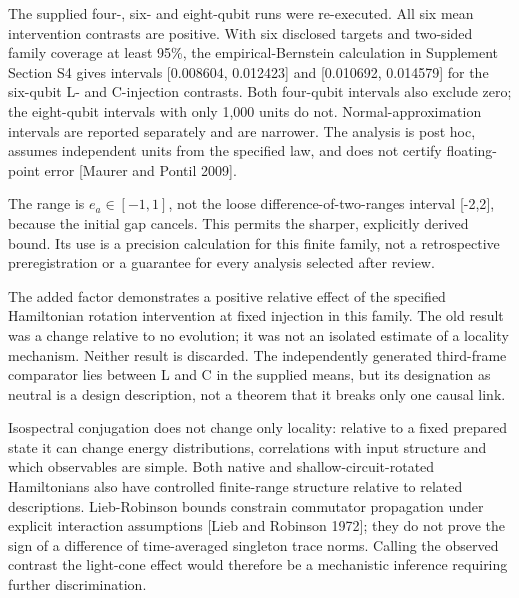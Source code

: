 \documentclass[
  10pt,
  a4paper,
]{article}
\makeatletter
\renewcommand\subsection{\@startsection{subsection}{2}{\z@}{-2ex \@plus -.8ex \@minus -.2ex}{.9ex \@plus .2ex}{\normalfont\large\bfseries}}
\makeatother
\begin{document}
The supplied four-, six- and eight-qubit runs were re-executed. All six
mean intervention contrasts are positive. With six disclosed targets and
two-sided family coverage at least 95\%, the empirical-Bernstein
calculation in Supplement Section S4 gives intervals {[}0.008604,
0.012423{]} and {[}0.010692, 0.014579{]} for the six-qubit L- and
C-injection contrasts. Both four-qubit intervals also exclude zero; the
eight-qubit intervals with only 1,000 units do not. Normal-approximation
intervals are reported separately and are narrower. The analysis is post
hoc, assumes independent units from the specified law, and does not
certify floating-point error {[}Maurer and Pontil 2009{]}.

The range is \(e_a\in[-1,1]\), not the loose difference-of-two-ranges
interval {[}-2,2{]}, because the initial gap cancels. This permits the
sharper, explicitly derived bound. Its use is a precision calculation
for this finite family, not a retrospective preregistration or a
guarantee for every analysis selected after review.

\subsection{6.4 Interpretation and
limits}\label{interpretation-and-limits}

The added factor demonstrates a positive relative effect of the
specified Hamiltonian rotation intervention at fixed injection in this
family. The old result was a change relative to no evolution; it was not
an isolated estimate of a locality mechanism. Neither result is
discarded. The independently generated third-frame comparator lies
between L and C in the supplied means, but its designation as neutral is
a design description, not a theorem that it breaks only one causal link.

Isospectral conjugation does not change only locality: relative to a
fixed prepared state it can change energy distributions, correlations
with input structure and which observables are simple. Both native and
shallow-circuit-rotated Hamiltonians also have controlled finite-range
structure relative to related descriptions. Lieb-Robinson bounds
constrain commutator propagation under explicit interaction assumptions
{[}Lieb and Robinson 1972{]}; they do not prove the sign of a difference
of time-averaged singleton trace norms. Calling the observed contrast
the light-cone effect would therefore be a mechanistic inference
requiring further discrimination.
\end{document}
